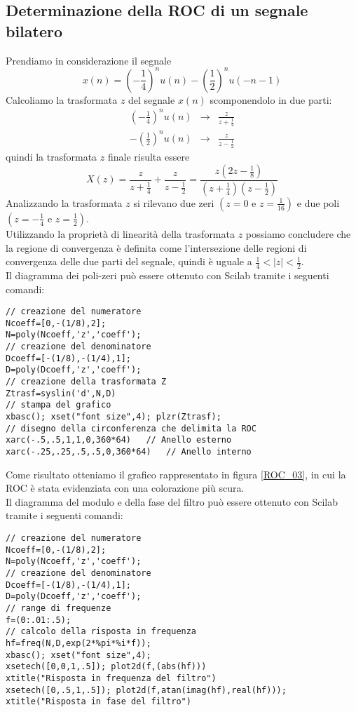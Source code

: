 \subsection{Determinazione della ROC di un segnale bilatero}
Prendiamo in considerazione il segnale
\begin{displaymath}
x(n)=\left(-\frac{1}{4}\right)^{n}u(n)-\left(\frac{1}{2}\right)^{n}u(-n-1)
\end{displaymath}
Calcoliamo la trasformata $z$ del segnale ${x(n)}$ scomponendolo in due parti:
\begin{eqnarray*}
\left(-\frac{1}{4}\right)^nu(n) & \longrightarrow & \frac{z}{z+\frac{1}{4}} \\
-\left(\frac{1}{2}\right)^n u(n) & \longrightarrow & \frac{z}{z-\frac{1}{2}}
\end{eqnarray*}
quindi la trasformata $z$ finale risulta essere
\begin{displaymath}
X(z) = \frac{z}{z+\frac{1}{4}}+\frac{z}{z-\frac{1}{2}}=\frac{z(2z-\frac{1}{8})}{(z+\frac{1}{4})(z-\frac{1}{2})}
\end{displaymath}
Analizzando la trasformata $z$ si rilevano due zeri $\left( z=0 \textrm{ e } z=\frac{1}{16} \right)$ e due poli $\left( z=-\frac{1}{4} \textrm{ e } z=\frac{1}{2}\right)$.\\
Utilizzando la propriet\`a di linearit\`a della trasformata $z$ possiamo concludere che la regione di convergenza \`e definita come l'intersezione delle regioni di convergenza delle due parti del segnale, quindi \`e uguale a $\frac{1}{4}<|z|<\frac{1}{2}$.\\
Il diagramma dei poli-zeri pu\`o essere ottenuto con Scilab tramite i seguenti comandi:
\begin{verbatim}
// creazione del numeratore
Ncoeff=[0,-(1/8),2];
N=poly(Ncoeff,'z','coeff');
// creazione del denominatore
Dcoeff=[-(1/8),-(1/4),1];
D=poly(Dcoeff,'z','coeff');
// creazione della trasformata Z
Ztrasf=syslin('d',N,D)
// stampa del grafico
xbasc(); xset("font size",4); plzr(Ztrasf);
// disegno della circonferenza che delimita la ROC
xarc(-.5,.5,1,1,0,360*64)	// Anello esterno
xarc(-.25,.25,.5,.5,0,360*64)	// Anello interno
\end{verbatim}
Come risultato otteniamo il grafico rappresentato in figura \ref{ROC_03}, in cui la ROC \`e stata evidenziata con una colorazione pi\`u scura.\\
Il diagramma del modulo e della fase del filtro pu\`o essere ottenuto con Scilab tramite i seguenti comandi:
\begin{verbatim}
// creazione del numeratore
Ncoeff=[0,-(1/8),2];
N=poly(Ncoeff,'z','coeff');
// creazione del denominatore
Dcoeff=[-(1/8),-(1/4),1];
D=poly(Dcoeff,'z','coeff');
// range di frequenze
f=(0:.01:.5);
// calcolo della risposta in frequenza
hf=freq(N,D,exp(2*%pi*%i*f));
xbasc(); xset("font size",4);
xsetech([0,0,1,.5]); plot2d(f,(abs(hf)))
xtitle("Risposta in frequenza del filtro")
xsetech([0,.5,1,.5]); plot2d(f,atan(imag(hf),real(hf)));
xtitle("Risposta in fase del filtro")
\end{verbatim}
